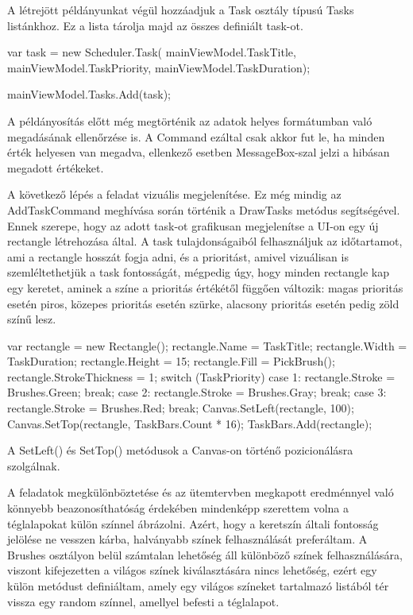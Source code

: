 A létrejött példányunkat végül hozzáadjuk a Task osztály típusú Tasks listánkhoz. Ez a lista tárolja majd az összes definiált task-ot.

\begin{java}
	var task = new Scheduler.Task(
	mainViewModel.TaskTitle,
	mainViewModel.TaskPriority,
	mainViewModel.TaskDuration);
	
	mainViewModel.Tasks.Add(task);
\end{java}

A példányosítás előtt még megtörténik az adatok helyes formátumban való megadásának ellenőrzése is. A Command ezáltal csak akkor fut le, ha minden érték helyesen van megadva, ellenkező esetben MessageBox-szal jelzi a hibásan megadott értékeket.


A következő lépés a feladat vizuális megjelenítése. Ez még mindig az AddTaskCommand meghívása során történik a DrawTasks metódus segítségével. Ennek szerepe, hogy az adott task-ot grafikusan megjelenítse a UI-on egy új rectangle létrehozása által. A task tulajdonságaiból felhasználjuk az időtartamot, ami a rectangle hosszát fogja adni, és a prioritást, amivel vizuálisan is szemléltethetjük a task fontosságát, mégpedig úgy, hogy minden rectangle kap egy keretet, aminek a színe a prioritás értékétől függően változik: magas prioritás esetén piros, közepes prioritás esetén szürke, alacsony prioritás esetén pedig zöld színű lesz.

\begin{java}
var rectangle = new Rectangle();
rectangle.Name = TaskTitle;
rectangle.Width = TaskDuration;
rectangle.Height = 15;
rectangle.Fill = PickBrush();
rectangle.StrokeThickness = 1;
switch (TaskPriority)
{
	case 1:
	rectangle.Stroke = Brushes.Green;
	break;
	case 2:
	rectangle.Stroke = Brushes.Gray;
	break;
	case 3:
	rectangle.Stroke = Brushes.Red;
	break;
}
Canvas.SetLeft(rectangle, 100);
Canvas.SetTop(rectangle, TaskBars.Count * 16);
TaskBars.Add(rectangle);
\end{java}

A SetLeft() és SetTop() metódusok a Canvas-on történő pozicionálásra szolgálnak.

A feladatok megkülönböztetése és az ütemtervben megkapott eredménnyel való könnyebb beazonosíthatóság érdekében mindenképp szerettem volna a téglalapokat külön színnel ábrázolni. Azért, hogy a keretszín általi fontosság jelölése ne vesszen kárba, halványabb színek felhasználását preferáltam. A Brushes osztályon belül számtalan lehetőség áll különböző színek felhasználására, viszont kifejezetten a világos színek kiválasztására nincs lehetőség, ezért egy külön metódust definiáltam, amely egy világos színeket tartalmazó listából tér vissza egy random színnel, amellyel befesti a téglalapot.

